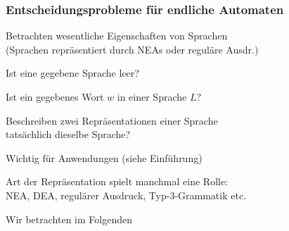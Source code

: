    \begin{frame}
      \frametitle{Entscheidungsprobleme für endliche Automaten}
      
      \begin{Itemize}
        \item
          Betrachten wesentliche Eigenschaften von Sprachen\\
          (Sprachen repräsentiert durch NEAs oder reguläre Ausdr.)
          \begin{Itemize}
            \item
              Ist eine gegebene Sprache leer?
            \item
              Ist ein gegebenes Wort $w$ in einer Sprache $L$?
            \item
              Beschreiben zwei Repräsentationen einer Sprache \\
              tatsächlich dieselbe Sprache?
          \end{Itemize}
          \par\smallskip
        \item<2->
          Wichtig für Anwendungen (siehe Einführung)
          \par\smallskip
        \item<3->
          Art der Repräsentation spielt manchmal eine Rolle: \\
          NEA, DEA, regulärer Ausdruck, Typ-3-Grammatik etc.\
          
          \par\smallskip
          Wir betrachten im Folgenden 
      \end{Itemize}

    \end{frame}

